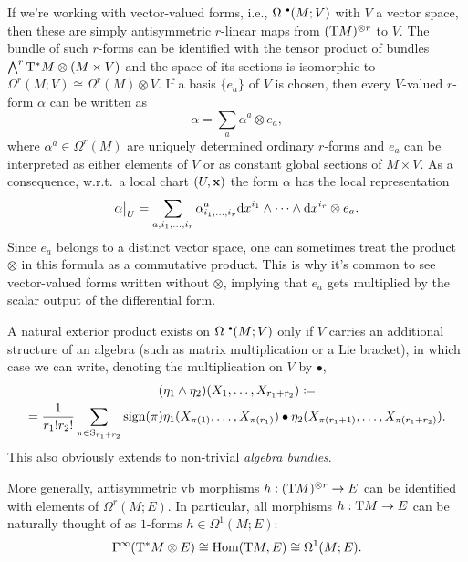 \begin{example}
    If we're working with vector-valued forms, i.e., $\Omega^{\smbullet }(M;V)$ with $V$ a vector space, then these are simply antisymmetric $r$-linear maps from $(\T M)^{\otimes r}$ to $V$. The bundle of such $r$-forms can be identified with the tensor product of bundles $\bigwedge^r \T^\ast M\otimes (M\times V)$ and the space of its sections is isomorphic to $\Omega^r(M;V)\cong \Omega^r(M)\otimes V$. If a basis $\{e_a\}$ of $V$ is chosen, then every $V$-valued $r$-form $\alpha$ can be written as
    \[\alpha=\sum_a \alpha^a\otimes e_a,\]
    where $\alpha^a\in \Omega^r(M)$ are uniquely determined ordinary $r$-forms and $e_a$ can be interpreted as either elements of $V$ or as constant global sections of $M\times V$. As a consequence, w.r.t.\ a local chart $(U,\bf{x})$ the form $\alpha$ has the local representation
    \[\restr{\alpha}{U}=\sum_{a,i_1,\ldots,i_r}\alpha^a_{i_1,\ldots,i_r}\dd x^{i_1}\wedge\cdots\wedge\dd x^{i_r}\otimes e_a.\]
    Since $e_a$ belongs to a distinct vector space, one can sometimes treat the product $\otimes$ in this formula as a commutative product. This is why it's common to see vector-valued forms written without $\otimes$, implying that $e_a$ gets multiplied by the scalar output of the differential form.

    A natural exterior product exists on $\Omega^{\smbullet }(M;V)$ only if $V$ carries an additional structure of an algebra (such as matrix multiplication or a Lie bracket), in which case we can write, denoting the multiplication on $V$ by $\bullet$,
    \begin{multline}
        (\eta_1\wedge\eta_2)(X_1,\ldots,X_{r_1+r_2})\coloneqq \\
        =\frac{1}{r_1!r_2!}\sum_{\pi\in \rmS_{r_1+r_2}}\sign(\pi)\eta_1(X_{\pi(1)},\ldots,X_{\pi(r_1)})\bullet \eta_2(X_{\pi(r_1+1)},\ldots,X_{\pi(r_1+r_2)}).\label{eq 2.4.17 RS1}
    \end{multline}
    This also obviously extends to non-trivial \emph{algebra bundles}.
\end{example}

\begin{example}
    More generally, antisymmetric \gls{vb} morphisms $h:(\T M)^{\otimes r}\to E$ can be identified with elements of $\Omega^r(M;E)$. In particular, all morphisms $h:\T M\to E$ can be naturally thought of as $1$-forms $h\in\Omega^1(M;E)$:
    \[\Gamma^\infty(\T^\ast M\otimes E)\cong \Hom(\T M,E)\cong \Omega^1(M;E).\]
\end{example}


